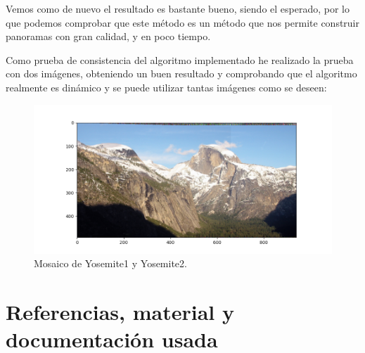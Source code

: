 \documentclass[12pt, spanish]{article}
\begin{document}
Vemos como de nuevo el resultado es bastante bueno, siendo el esperado, por lo que podemos comprobar que este método es un método que nos permite construir panoramas con gran calidad, y en poco tiempo.


\newpage

Como prueba de consistencia del algoritmo implementado he realizado la prueba con dos imágenes, obteniendo un buen resultado y comprobando que el algoritmo realmente es dinámico y se puede utilizar tantas imágenes como se deseen:


\begin{figure}[H]
  \centering
      \includegraphics[width=\textwidth]{mosaico_dos_imagenes.png}
 		\caption{Mosaico de Yosemite1 y Yosemite2.}
\end{figure}



\newpage

\section{Referencias, material y documentación usada}
\end{document}
